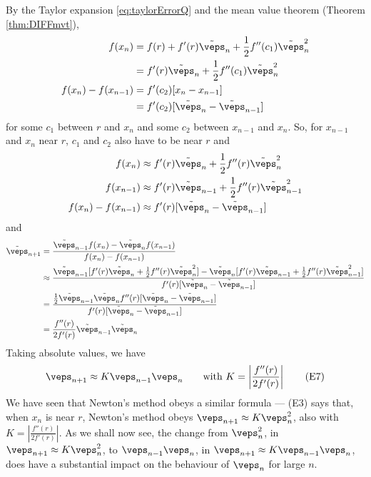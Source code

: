 By the Taylor expansion \eqref{eq:taylorErrorQ}
and the mean value theorem (Theorem \ref{thm:DIFFmvt}),
\begin{align*}
f(x_n)&= f(r) + f'(r)\tilde\veps_n +\frac{1}{2} f''(c_1) \tilde\veps_n^2 \\
      &= f'(r)\tilde\veps_n +\frac{1}{2} f''(c_1) \tilde\veps_n^2 \\
f(x_n)-f(x_{n-1})&= f'(c_2)[x_n-x_{n-1}] \\
                &= f'(c_2)[\tilde\veps_n-\tilde\veps_{n-1}]
\end{align*}
for some $c_1$ between $r$ and $x_n$ and some $c_2$ between $x_{n-1}$ and $x_n$. 
So, for $x_{n-1}$ and $x_n$ near $r$, $c_1$ and $c_2$ also have to be near $r$ and
\begin{align*}
f(x_n)&\approx f'(r)\tilde\veps_n +\frac{1}{2} f''(r) \tilde\veps_n^2 \\
f(x_{n-1})&\approx f'(r)\tilde\veps_{n-1} +\frac{1}{2} f''(r) \tilde\veps_{n-1}^2 \\
f(x_n)-f(x_{n-1})&\approx f'(r)[\tilde\veps_n-\tilde\veps_{n-1}] 
\end{align*}
and
\begin{align*}
\tilde\veps_{n+1} &= \frac{\tilde\veps_{n-1} f(x_n) - \tilde\veps_n f(x_{n-1}) }
                                              {f(x_n)-f(x_{n-1})} \\
 &\approx \frac{ \tilde\veps_{n-1} [f'(r)\tilde\veps_n +\frac{1}{2} f''(r) \tilde\veps_n^2]
               -  \tilde\veps_n [f'(r)\tilde\veps_{n-1} +\frac{1}{2} f''(r) \tilde\veps_{n-1}^2] }
                    { f'(r)[\tilde\veps_n-\tilde\veps_{n-1}] }  
\\
  &= \frac{\frac{1}{2}\tilde\veps_{n-1}\tilde\veps_nf''(r)[\tilde\veps_n-\tilde\veps_{n-1}]}
               { f'(r)[\tilde\veps_n-\tilde\veps_{n-1}] } 
\\
&= \frac{f''(r)} {2f'(r)} \tilde\veps_{n-1}\tilde\veps_n
\end{align*}
Taking absolute values, we have
\begin{equation*}
\veps_{n+1}\approx K \veps_{n-1}\veps_n\qquad
\text{with }K = \left|\frac{f''(r)} {2f'(r)} \right|
\tag{E7}\end{equation*} 
We have seen that Newton's method obeys a similar formula ---
(E3) says that, when $x_n$ is near $r$, Newton's method obeys $\veps_{n+1}\approx K\veps_n^2$, also with 
$K = \left|\frac{f''(r)} {2f'(r)} \right|$.
As we shall now see, the change from $\veps_n^2$, in 
$\veps_{n+1}\approx K\veps_n^2$, to $\veps_{n-1}\veps_n$, in 
$\veps_{n+1}\approx K\veps_{n-1}\veps_n$,
does have a substantial impact on the behaviour of $\veps_n$ for large $n$.

